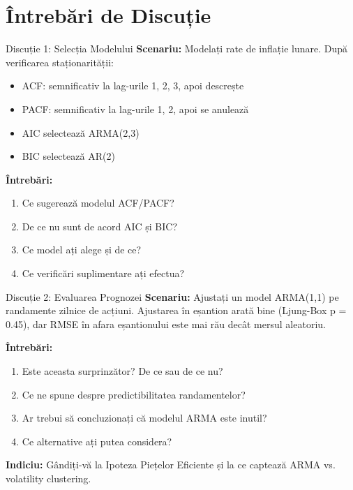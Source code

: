 \documentclass[9pt, aspectratio=169, t]{beamer}
\begin{document}
\section{Întrebări de Discuție}

\begin{frame}{Discuție 1: Selecția Modelului}
    \textbf{Scenariu:} Modelați rate de inflație lunare. După verificarea staționarității:
    \begin{itemize}
        \item ACF: semnificativ la lag-urile 1, 2, 3, apoi descrește
        \item PACF: semnificativ la lag-urile 1, 2, apoi se anulează
        \item AIC selectează ARMA(2,3)
        \item BIC selectează AR(2)
    \end{itemize}

    \vspace{0.3cm}
    \textbf{Întrebări:}
    \begin{enumerate}
        \item Ce sugerează modelul ACF/PACF?
        \item De ce nu sunt de acord AIC și BIC?
        \item Ce model ați alege și de ce?
        \item Ce verificări suplimentare ați efectua?
    \end{enumerate}
\end{frame}

\begin{frame}{Discuție 2: Evaluarea Prognozei}
    \textbf{Scenariu:} Ajustați un model ARMA(1,1) pe randamente zilnice de acțiuni. Ajustarea în eșantion arată bine (Ljung-Box p = 0.45), dar RMSE în afara eșantionului este mai rău decât mersul aleatoriu.

    \vspace{0.3cm}
    \textbf{Întrebări:}
    \begin{enumerate}
        \item Este aceasta surprinzător? De ce sau de ce nu?
        \item Ce ne spune despre predictibilitatea randamentelor?
        \item Ar trebui să concluzionați că modelul ARMA este inutil?
        \item Ce alternative ați putea considera?
    \end{enumerate}

    \vspace{0.3cm}
    \textbf{Indiciu:} Gândiți-vă la Ipoteza Piețelor Eficiente și la ce captează ARMA vs. volatility clustering.
\end{frame}
\end{document}
